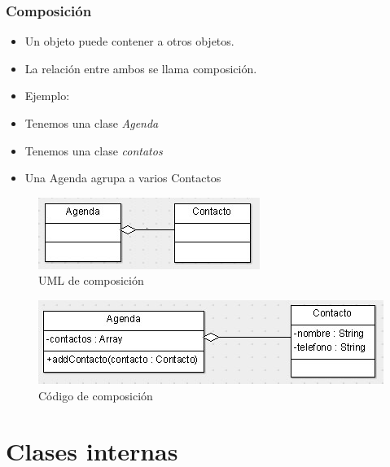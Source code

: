 \documentclass{beamer}
\begin{document}
\begin{frame}
    \frametitle{Composición}
\begin{multicols}{2}
\begin{footnotesize}
\begin{itemize}[<+->]
\item Un objeto puede contener a otros objetos.
\item La relación entre ambos se llama \alert{composición}.
\item Ejemplo:
\item Tenemos una clase \emph{Agenda}
\item Tenemos una clase \emph{contatos}
\item Una Agenda agrupa a varios Contactos
\end{itemize}
\end{footnotesize}
\begin{figure}
\includegraphics[scale=0.5]{imagenes/uml1.jpg}
\caption{UML de composición}
\end{figure}

\begin{figure}
\includegraphics[scale=0.4]{imagenes/uml2.jpg}
\caption{Código de composición}
\end{figure}
\end{multicols}
\end{frame}


\section{Clases internas}
\end{document}
